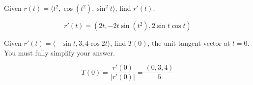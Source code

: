 \documentclass[addpoints]{exam}
\begin{document}
\printanswers
\begin{questions}
\question[30]  Given $r(t) = \langle t^2, \cos (t^2) , \sin ^2 t \rangle$, find $r'(t)$.  
\begin{solution}
\[
r'(t) = (2t, -2t \sin(t^2), 2 \sin t \cos t)
\]
\end{solution}
\question[30] Given $r'(t) = \langle - \sin t , 3, 4 \cos 2t \rangle$, find $T(0)$, the unit tangent vector at $t = 0$. You must fully simplify your answer. 
\begin{solution}
\[
T(0) = \frac{r'(0)}{|r'(0)|} = \frac{(0,3,4)}{5}
\]
\end{solution}


\end{questions}
\end{document}
